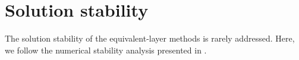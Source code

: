 %
%
%

\section{Solution stability}

The solution stability of the equivalent-layer methods is rarely addressed.
Here, we follow the numerical stability analysis presented in \cite{siqueira-etal2017}.


